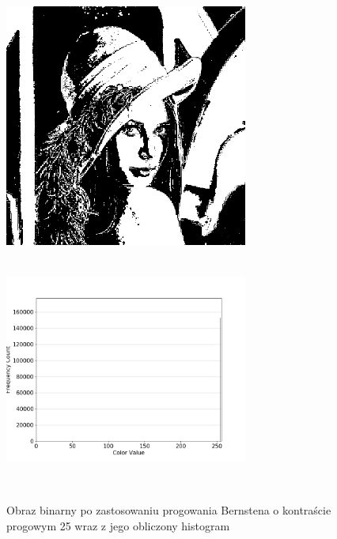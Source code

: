 \documentclass[a4paper,12pt]{book}
\begin{document}
\begin{figure}[H]
	\caption{Obraz binarny po zastosowaniu progowania Bernstena o kontraście progowym 25 wraz z jego obliczony histogram}
	\includegraphics[width=8cm, height=8cm]{5-4/local-threshold-image-lena-25.png}
	\includegraphics[width=8cm, height=8cm]{5-4/local-threshold-lena-25.png}
	

\end{figure}
\end{document}
